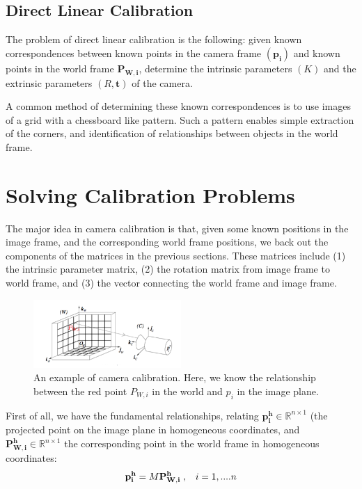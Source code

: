 \documentclass[]{article}
\begin{document}
\subsection{Direct Linear Calibration}
The problem of direct linear calibration is the following: given known correspondences between known points in the camera frame $(\boldsymbol{p_i})$ and known points in the world frame $\boldsymbol{P_{W,i}}$, determine the intrinsic parameters $(K)$ and the extrinsic parameters $(R,\boldsymbol{t})$ of the camera.

A common method of determining these known correspondences is to use images of a grid with a chessboard like pattern. Such a pattern enables simple extraction of the corners, and identification of relationships between objects in the world frame.


\section{Solving Calibration Problems}

The major idea in camera calibration is that, given some known positions in the image frame, and the corresponding world frame positions, we back out the components of the matrices in the previous sections. These matrices include (1) the intrinsic parameter matrix, (2) the rotation matrix from image frame to world frame, and (3) the vector connecting the world frame and image frame.\\

\begin{figure}[H]
\includegraphics[width=0.5\textwidth]{vik_image_4.png}
\centering
\caption{An example of camera calibration. Here, we know the relationship between the red point $P_{W,i}$ in the world and $p_i$ in the image plane.}
\label{fig:calibration}
\end{figure}

First of all, we have the fundamental relationships, relating $\mathbf{p_i^h} \in \mathbb{R}^{n \times 1}$ (the projected point on the image plane in homogeneous coordinates, and $\mathbf{P_{W,i}^h} \in \mathbb{R}^{n \times 1}$ the corresponding point in the world frame in homogeneous coordinates:
\begin{equation}
    \mathbf{p_i^h} = M \mathbf{P_{W,i}^{h}}\hspace{1mm}, \hspace{3mm}i = 1,....n
\end{equation}
\end{document}
